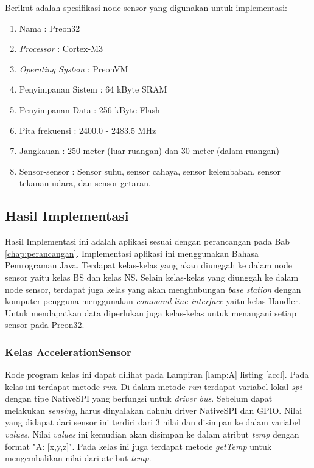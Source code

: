 Berikut adalah spesifikasi node sensor yang digunakan untuk implementasi:
\begin{enumerate}
    \item Nama : Preon32
    \item \textit{Processor} : Cortex-M3
    \item \textit{Operating System} : PreonVM
    \item Penyimpanan Sistem : 64 kByte SRAM
    \item Penyimpanan Data : 256 kByte Flash
    \item Pita frekuensi : 2400.0 - 2483.5 MHz
    \item Jangkauan : 250 meter (luar ruangan) dan 30 meter (dalam ruangan)
    \item Sensor-sensor : Sensor suhu, sensor cahaya, sensor kelembaban, sensor tekanan udara, dan sensor getaran.
\end{enumerate}

\subsection{Hasil Implementasi}

Hasil Implementasi ini adalah aplikasi sesuai dengan perancangan pada Bab \ref{chap:perancangan}. Implementasi aplikasi ini menggunakan Bahasa Pemrograman Java. Terdapat kelas-kelas yang akan diunggah ke dalam node sensor yaitu kelas BS dan kelas NS. Selain kelas-kelas yang diunggah ke dalam node sensor, terdapat juga kelas yang akan menghubungan \textit{base station} dengan komputer pengguna menggunakan \textit{command line interface} yaitu kelas Handler. Untuk mendapatkan data diperlukan juga kelas-kelas untuk menangani setiap sensor pada Preon32.

\subsubsection{Kelas AccelerationSensor}
Kode program kelas ini dapat dilihat pada Lampiran \ref{lamp:A} listing \ref{accl}. Pada kelas ini terdapat metode \textit{run}. Di dalam metode \textit{run} terdapat variabel lokal \textit{spi} dengan tipe NativeSPI yang berfungsi untuk \textit{driver bus}. Sebelum dapat melakukan \textit{sensing}, harus dinyalakan dahulu driver NativeSPI dan GPIO. Nilai yang didapat dari sensor ini terdiri dari 3 nilai dan disimpan ke dalam variabel \textit{values}. Nilai \textit{values} ini kemudian akan disimpan ke dalam atribut \textit{temp} dengan format "A: [x,y,z]". Pada kelas ini juga terdapat metode \textit{getTemp} untuk mengembalikan nilai dari atribut \textit{temp}. 

